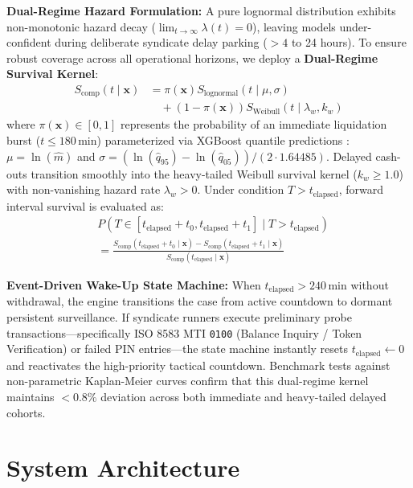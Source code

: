\documentclass[conference]{IEEEtran}
\begin{document}
\textbf{Dual-Regime Hazard Formulation:} A pure lognormal distribution exhibits non-monotonic hazard decay ($\lim_{t \to \infty} \lambda(t) = 0$), leaving models under-confident during deliberate syndicate delay parking ($>4$ to 24 hours). To ensure robust coverage across all operational horizons, we deploy a \textbf{Dual-Regime Survival Kernel}:
\begin{equation}
\begin{split}
S_{\text{comp}}(t \mid \mathbf{x}) &= \pi(\mathbf{x}) S_{\text{lognormal}}(t \mid \mu, \sigma) \\
&\quad + (1 - \pi(\mathbf{x})) S_{\text{Weibull}}(t \mid \lambda_w, k_w)
\end{split}
\end{equation}
where $\pi(\mathbf{x}) \in [0, 1]$ represents the probability of an immediate liquidation burst ($t \le 180$\,min) parameterized via XGBoost quantile predictions \cite{chen2016}: $\mu = \ln(\hat{m})$ and $\sigma = (\ln(\hat{q}_{95}) - \ln(\hat{q}_{05})) / (2 \cdot 1.64485)$. Delayed cash-outs transition smoothly into the heavy-tailed Weibull survival kernel ($k_w \ge 1.0$) with non-vanishing hazard rate $\lambda_w > 0$. Under condition $T > t_{\text{elapsed}}$, forward interval survival is evaluated as:
\begin{align}
&P(T \in [t_{\text{elapsed}} + t_0, t_{\text{elapsed}} + t_1] \mid T > t_{\text{elapsed}}) \nonumber \\
&= \frac{S_{\text{comp}}(t_{\text{elapsed}} + t_0 \mid \mathbf{x}) - S_{\text{comp}}(t_{\text{elapsed}} + t_1 \mid \mathbf{x})}{S_{\text{comp}}(t_{\text{elapsed}} \mid \mathbf{x})}
\end{align}

\textbf{Event-Driven Wake-Up State Machine:} When $t_{\text{elapsed}} > 240$\,min without withdrawal, the engine transitions the case from active countdown to dormant persistent surveillance. If syndicate runners execute preliminary probe transactions---specifically ISO 8583 MTI \texttt{0100} (Balance Inquiry / Token Verification) or failed PIN entries---the state machine instantly resets $t_{\text{elapsed}} \gets 0$ and reactivates the high-priority tactical countdown. Benchmark tests against non-parametric Kaplan-Meier curves confirm that this dual-regime kernel maintains $<0.8\%$ deviation across both immediate and heavy-tailed delayed cohorts.

\section{System Architecture}
\end{document}
